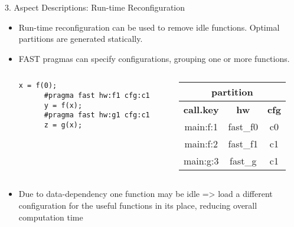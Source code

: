 \begin{frame}[fragile]{3. Aspect Descriptions: Run-time Reconfiguration}
  \begin{itemize}
  \item Run-time reconfiguration can be used to remove idle
    functions. Optimal partitions are generated statically.
  \item FAST pragmas can specify configurations, grouping one
    or more functions.
    \begin{columns}
      \begin{column}{.55\textwidth}
        \begin{center}
    \begin{lstlisting}[style=MaxC]
      x = f(0);
      #pragma fast hw:f1 cfg:c1
      y = f(x);
      #pragma fast hw:g1 cfg:c1
      z = g(x);
    \end{lstlisting}
    \end{center}
    \end{column}
    \begin{column}{.45\textwidth}
      {\footnotesize
      \begin{table}[!h]
        \renewcommand{\arraystretch}{1.1}
      \hspace{-1cm}
        \begin{tabular}{c|c|c}
          \multicolumn{3}{c}{\bf{partition}} \\
          \hline
          \bf{call.key} & \bf{hw} & \bf{cfg}  \\
          \hline
          main:f:1 & fast\_f0 & c0 \\
          main:f:2 & fast\_f1 & c1 \\
          main:g:3 & fast\_g & c1 \\
        \end{tabular}
      \end{table}
    }
    \end{column}
    \end{columns}
  \item Due to data-dependency one function may be idle => load a
    different configuration for the useful functions in its place,
    reducing overall computation time
  \end{itemize}
\end{frame}

